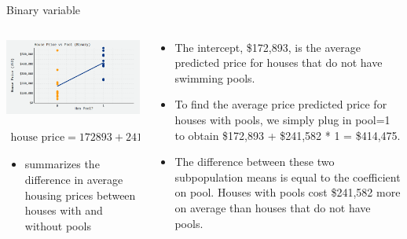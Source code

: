 \documentclass[australian,ignorenonframetext,aspectratio=169]{beamer}
\providecommand{\tightlist}{%
  \setlength{\itemsep}{0pt}\setlength{\parskip}{0pt}}
\begin{document}
\begin{frame}{Binary variable}
\protect\hypertarget{binary-variable}{}

\begin{columns}[T]
\begin{column}{0.5\textwidth}
\begin{center}\includegraphics[width=1\linewidth]{../graphs/interpret-1} \end{center}

\(\begin{aligned} \text{house price} = 172893 + 241582 * pool \end{aligned}\)

\begin{itemize}
\tightlist
\item
  summarizes the difference in average housing prices between houses
  with and without pools
\end{itemize}
\end{column}

\begin{column}{0.5\textwidth}
\small

\begin{itemize}
\item
  The intercept, \$172,893, is the average predicted price for houses
  that do not have swimming pools.
\item
  To find the average price predicted price for houses with pools, we
  simply plug in pool=1 to obtain \$172,893 + \$241,582 * 1 = \$414,475.
\item
  The difference between these two subpopulation means is equal to the
  coefficient on pool. Houses with pools cost \$241,582 more on average
  than houses that do not have pools.
\end{itemize}
\end{column}
\end{columns}

\end{frame}
\end{document}
